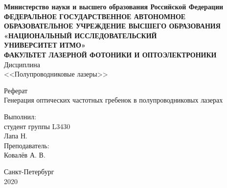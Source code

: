 \begin{center}
    \hfill \break
    \footnotesize{\textbf{Министерство науки и высшего образования Российской Федерации}} \\
    \scriptsize{\textbf{ФЕДЕРАЛЬНОЕ ГОСУДАРСТВЕННОЕ АВТОНОМНОЕ ОБРАЗОВАТЕЛЬНОЕ УЧРЕЖДЕНИЕ ВЫСШЕГО ОБРАЗОВАНИЯ}} \\
    \normalsize{\textbf{«НАЦИОНАЛЬНЫЙ ИССЛЕДОВАТЕЛЬСКИЙ \\ УНИВЕРСИТЕТ ИТМО»}} \\
    \hfill \break
    \normalsize{\textbf{ФАКУЛЬТЕТ ЛАЗЕРНОЙ ФОТОНИКИ И ОПТОЭЛЕКТРОНИКИ}} \\
    \hfill \break
    \normalsize{Дисциплина} \\
    \normalsize{<<Полупроводниковые лазеры>>} \\
\end{center}
\hfill \break
\begin{center}
    \large{Реферат} \\
    \normalsize{Генерация оптических частотных гребенок в полупроводниковых лазерах}\\
\end{center}
\hfill \break
\hfill \break
\hfill \break
\begin{flushright}
    Выполнил: \\
    студент группы L3430 \\
    Лапа Н. \\
    Преподаватель: \\
    Ковалёв А. В.
\end{flushright}
\hfill \break
\hfill \break
\hfill \break
\hfill \break
\hfill \break
\begin{center} Санкт-Петербург \\ 2020 \end{center}
\thispagestyle{empty}
\newpage